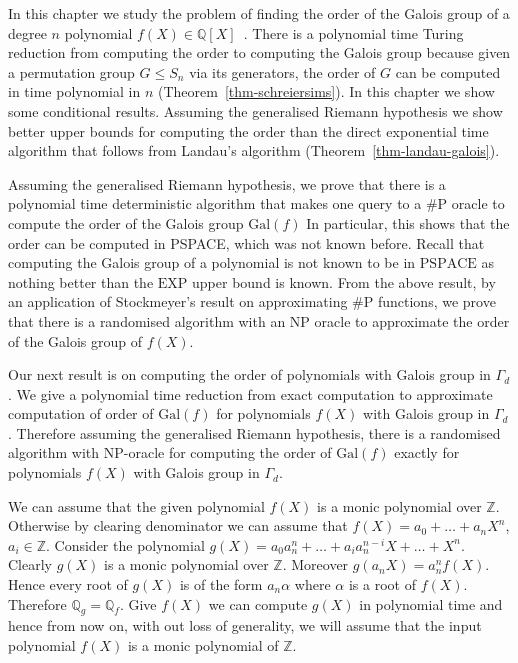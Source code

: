 \documentclass[11pt]{madras}%
\theoremstyle{remark}
\newcommand{\Gal}[1]{{\ensuremath{\mathrm{Gal}\left(#1\right)}}}
\begin{document}
In this chapter we study the problem of finding the order of the
Galois group of a degree $n$ polynomial $f(X) \in
\mathbb{Q}[X]$~\cite{arvind2003galois}. There is a polynomial time
Turing reduction from computing the order to computing the Galois
group because given a permutation group $G \leq S_n$ via its
generators, the order of $G$ can be computed in time polynomial in $n$
(Theorem~\ref{thm-schreiersims}).  In this chapter we show some
conditional results. Assuming the generalised Riemann hypothesis we
show better upper bounds for computing the order than the direct
exponential time algorithm that follows from Landau's algorithm
(Theorem~\ref{thm-landau-galois}).

Assuming the generalised Riemann hypothesis, we prove that there is a
polynomial time deterministic algorithm that makes one query to a $\#
\mathrm{P}$ oracle to compute the order of the Galois group $\Gal{f}$
In particular, this shows that the order can be computed in PSPACE,
which was not known before. Recall that computing the Galois group of
a polynomial is not known to be in $\mathrm{PSPACE}$ as nothing better
than the $\mathrm{EXP}$ upper bound is known. From the above result,
by an application of Stockmeyer's result on approximating $\#
\mathrm{P}$ functions, we prove that there is a randomised algorithm
with an $\mathrm{NP}$ oracle to approximate the order of the Galois
group of $f(X)$.

Our next result is on computing the order of polynomials with Galois
group in $\Gamma_d$.  We give a polynomial time reduction from exact
computation to approximate computation of order of $\Gal{f}$ for
polynomials $f(X)$ with Galois group in $\Gamma_d$. Therefore assuming
the generalised Riemann hypothesis, there is a randomised algorithm
with $\mathrm{NP}$-oracle for computing the order of $\Gal{f}$ exactly
for polynomials $f(X)$ with Galois group in $\Gamma_d$.


We can assume that the given polynomial $f(X)$ is a monic polynomial
over $\mathbb{Z}$. Otherwise by clearing denominator we can assume
that $f(X) = a_0 + \ldots + a_n X^n$, $a_i \in \mathbb{Z}$. Consider
the polynomial $g(X) = a_0a_n^n + \ldots + a_i a_n^{n-i} X + \ldots +
X^n$. Clearly $g(X)$ is a monic polynomial over $\mathbb{Z}$. Moreover
$g(a_n X) = a_n^n f(X)$. Hence every root of $g(X)$ is of the form
$a_n \alpha$ where $\alpha$ is a root of $f(X)$. Therefore
$\mathbb{Q}_g = \mathbb{Q}_f$. Give $f(X)$ we can compute $g(X)$ in
polynomial time and hence from now on, with out loss of generality, we
will assume that the input polynomial $f(X)$ is a monic polynomial of
$\mathbb{Z}$.
\end{document}
